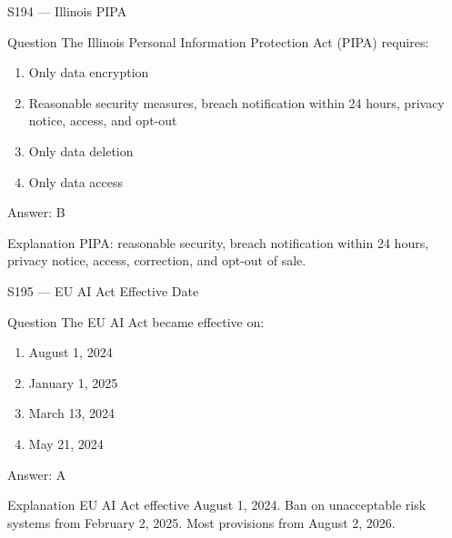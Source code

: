 \documentclass[aspectratio=169,8pt]{beamer}
\begin{document}
\begin{frame}{S194 --- Illinois PIPA}
	\begin{block}{Question}
		The Illinois Personal Information Protection Act (PIPA) requires:
		\begin{enumerate}
			\item Only data encryption
			\item Reasonable security measures, breach notification within 24 hours, privacy notice, access, and opt-out
			\item Only data deletion
			\item Only data access
		\end{enumerate}
	\end{block}
	\begin{exampleblock}{Answer: B}\end{exampleblock}
	\begin{block}{Explanation}
		PIPA: reasonable security, breach notification within 24 hours, privacy notice, access, correction, and opt-out of sale.
	\end{block}
\end{frame}

\begin{frame}{S195 --- EU AI Act Effective Date}
	\begin{block}{Question}
		The EU AI Act became effective on:
		\begin{enumerate}
			\item August 1, 2024
			\item January 1, 2025
			\item March 13, 2024
			\item May 21, 2024
		\end{enumerate}
	\end{block}
	\begin{exampleblock}{Answer: A}\end{exampleblock}
	\begin{block}{Explanation}
		EU AI Act effective August 1, 2024. Ban on unacceptable risk systems from February 2, 2025. Most provisions from August 2, 2026.
	\end{block}
\end{frame}
\end{document}
